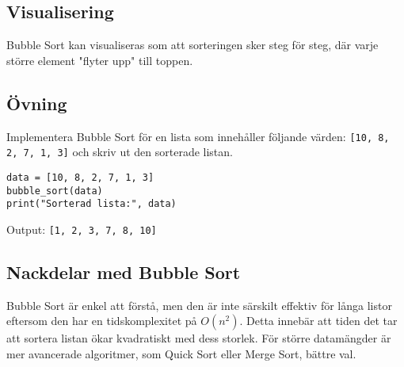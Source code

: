 \subsection*{Visualisering}
Bubble Sort kan visualiseras som att sorteringen sker steg för steg, där varje större element "flyter upp" till toppen.

\subsection*{Övning}
\begin{exercise}
Implementera Bubble Sort för en lista som innehåller följande värden: \texttt{[10, 8, 2, 7, 1, 3]} och skriv ut den sorterade listan.
\end{exercise}
\begin{solution}
\begin{lstlisting}
data = [10, 8, 2, 7, 1, 3]
bubble_sort(data)
print("Sorterad lista:", data)
\end{lstlisting}
Output: \texttt{[1, 2, 3, 7, 8, 10]}
\end{solution}

\subsection*{Nackdelar med Bubble Sort}
Bubble Sort är enkel att förstå, men den är inte särskilt effektiv för långa listor eftersom den har en tidskomplexitet på \(O(n^2)\). Detta innebär att tiden det tar att sortera listan ökar kvadratiskt med dess storlek. För större datamängder är mer avancerade algoritmer, som Quick Sort eller Merge Sort, bättre val.

